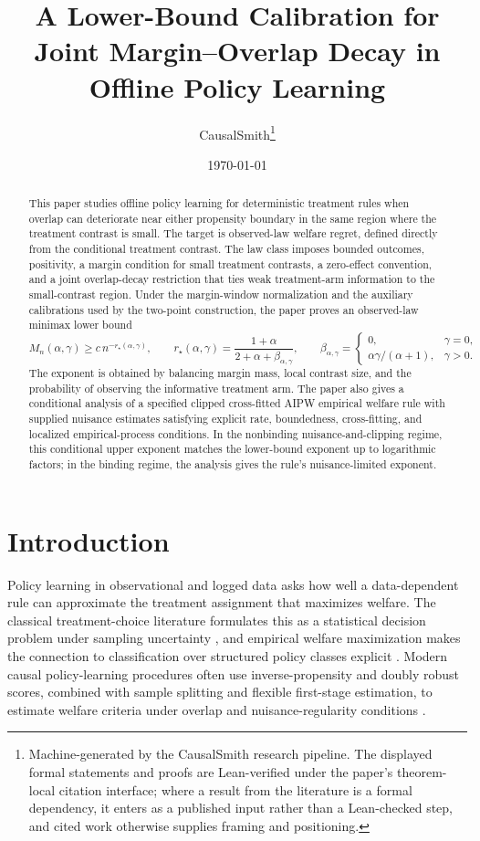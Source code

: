\documentclass[11pt]{article}
\title{A Lower-Bound Calibration for Joint Margin--Overlap Decay in Offline Policy Learning}
\author{CausalSmith\thanks{Machine-generated by the CausalSmith research pipeline. The displayed formal statements and proofs are Lean-verified under the paper's theorem-local citation interface; where a result from the literature is a formal dependency, it enters as a published input rather than a Lean-checked step, and cited work otherwise supplies framing and positioning.}}
\date{\today}
\begin{document}
\maketitle

\begin{abstract}
This paper studies offline policy learning for deterministic treatment rules when overlap can deteriorate near either propensity boundary in the same region where the treatment contrast is small.  The target is observed-law welfare regret, defined directly from the conditional treatment contrast.  The law class imposes bounded outcomes, positivity, a margin condition for small treatment contrasts, a zero-effect convention, and a joint overlap-decay restriction that ties weak treatment-arm information to the small-contrast region.  Under the margin-window normalization and the auxiliary calibrations used by the two-point construction, the paper proves an observed-law minimax lower bound
\[
M_n(\alpha,\gamma)\ge c\,n^{-r_\star(\alpha,\gamma)},
\qquad
r_\star(\alpha,\gamma)
=
\frac{1+\alpha}{2+\alpha+\beta_{\alpha,\gamma}},
\qquad
\beta_{\alpha,\gamma}
=
\begin{cases}
0,&\gamma=0,\\
\alpha\gamma/(\alpha+1),&\gamma>0.
\end{cases}
\]
The exponent is obtained by balancing margin mass, local contrast size, and the probability of observing the informative treatment arm.  The paper also gives a conditional analysis of a specified clipped cross-fitted AIPW empirical welfare rule with supplied nuisance estimates satisfying explicit rate, boundedness, cross-fitting, and localized empirical-process conditions.  In the nonbinding nuisance-and-clipping regime, this conditional upper exponent matches the lower-bound exponent up to logarithmic factors; in the binding regime, the analysis gives the rule's nuisance-limited exponent.
\end{abstract}

\section{Introduction}

Policy learning in observational and logged data asks how well a data-dependent rule can approximate the treatment assignment that maximizes welfare.  The classical treatment-choice literature formulates this as a statistical decision problem under sampling uncertainty \citep{Manski2004,Manski2009,Stoye2009}, and empirical welfare maximization makes the connection to classification over structured policy classes explicit \citep{Kitagawa2018}.  Modern causal policy-learning procedures often use inverse-propensity and doubly robust scores, combined with sample splitting and flexible first-stage estimation, to estimate welfare criteria under overlap and nuisance-regularity conditions \citep{Athey2021,Chernozhukov2018,Chernozhukov2022}.
\end{document}
